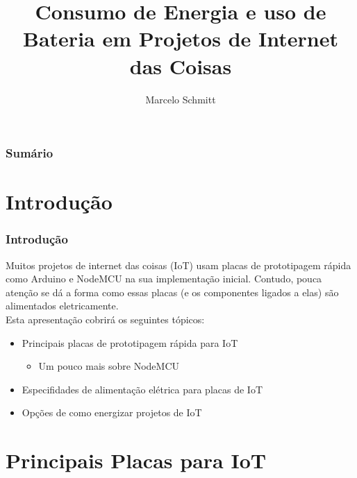 \documentclass{beamer}
\title[Energia em IoT]{Consumo de Energia e uso de Bateria em Projetos de Internet das Coisas}
\author[Marcelo Schmitt]{Marcelo Schmitt}
\institute[IME-USP]{Universidade de São Paulo}
\date{}
\begin{document}
\begin{frame}
 \maketitle
\end{frame}

\begin{frame}
\frametitle{Sumário}
 \tableofcontents
\end{frame}

\section{Introdução}
\begin{frame}
\frametitle{Introdução}
\begin{minipage}{\textwidth}

Muitos projetos de internet das coisas (IoT) usam placas de prototipagem rápida como Arduino e NodeMCU na sua implementação inicial. Contudo, pouca atenção se dá a forma como essas placas (e os componentes ligados a elas) são alimentados eletricamente. \\


Esta apresentação cobrirá os seguintes tópicos:
\begin{itemize}
	\item Principais placas de prototipagem rápida para IoT
	\begin{itemize}
		\item Um pouco mais sobre NodeMCU
	\end{itemize}
	\item Especifidades de alimentação elétrica para placas de IoT
	\item Opções de como energizar projetos de IoT
\end{itemize}

\end{minipage}
\end{frame}

\section{Principais Placas para IoT}
\end{document}
